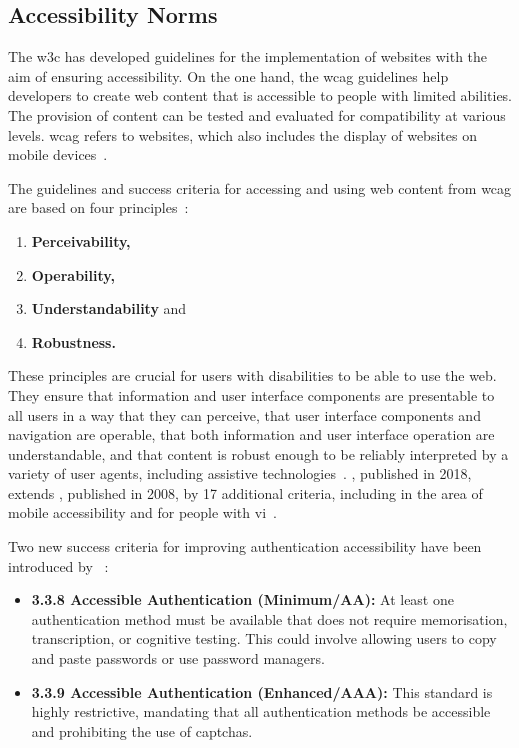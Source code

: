 \subsection{Accessibility Norms}
\label{sec:understanding:accessibility}

The \ac{w3c} has developed guidelines for the implementation of websites with the aim of ensuring accessibility. On the one hand, the \ac{wcag} guidelines help developers to create web content that is accessible to people with limited abilities. The provision of content can be tested and evaluated for compatibility at various levels. \Ac{wcag} refers to websites, which also includes the display of websites on mobile devices~\cite{wcag_2023}. 

The guidelines and success criteria for accessing and using web content from \ac{wcag} are based on four principles~\cite{wcag_2023}: 

\begin{enumerate}
    \item \textbf{Perceivability,}
    \item \textbf{Operability,}
    \item \textbf{Understandability} and
    \item \textbf{Robustness.}
\end{enumerate}

\pspace{}These principles are crucial for users with disabilities to be able to use the web. They ensure that information and user interface components are presentable to all users in a way that they can perceive, that user interface components and navigation are operable, that both information and user interface operation are understandable, and that content is robust enough to be reliably interpreted by a variety of user agents, including assistive technologies~\cite{wcag_2023}. , published in 2018, extends , published in 2008, by 17 additional criteria, including in the area of mobile accessibility and for people with \ac{vi}~\cite{wcag_2008, wcag_2018}.

\pspace{}Two new success criteria for improving authentication accessibility have been introduced by ~\cite{wcag_2023}:

\begin{itemize}
    \item \textbf{3.3.8 Accessible Authentication (Minimum/AA):} At least one authentication method must be available that does not require memorisation, transcription, or cognitive testing. This could involve allowing users to copy and paste passwords or use password managers.
    \item \textbf{3.3.9 Accessible Authentication (Enhanced/AAA):}  This standard is highly restrictive, mandating that all authentication methods be accessible and prohibiting the use of \acp{captcha}.
\end{itemize}

